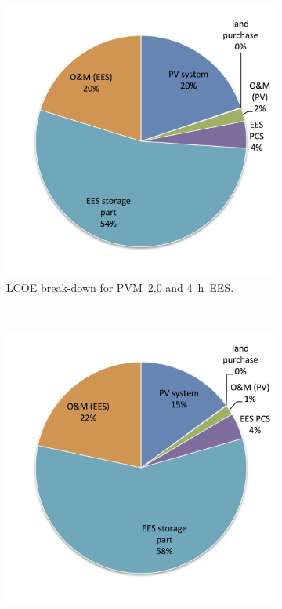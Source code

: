 \begin{figure}[!htbp]
        \centering                
        \begin{subfigure}[b]{0.5\textwidth}
                \centering
                \includegraphics[width=1\textwidth]{FIG/PV_LCOE_lowinvest_BreakDown}
                \caption{LCOE break-down for PVM~2.0 and \SI{4}{h}~EES.}\label{PV_LCOE_lowinvest_BreakDown}
        \end{subfigure}%
        ~
        \begin{subfigure}[b]{0.5\textwidth}
                \centering
                \includegraphics[width=1\textwidth]{FIG/PV_LCOE_highinvest_BreakDown}

\end{subfigure}
\end{figure}
